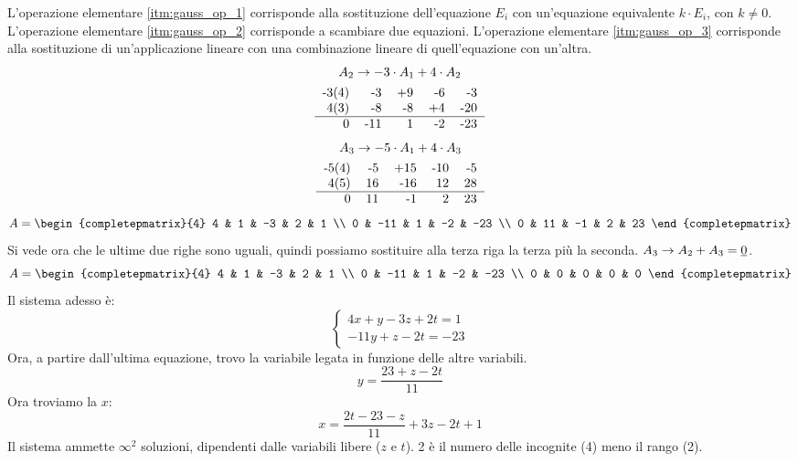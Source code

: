 \begin{exmp}
L'operazione elementare \ref{itm:gauss_op_1} corrisponde alla sostituzione dell'equazione $E_i$ con un'equazione equivalente $k \cdot E_i$, con $k \neq 0$. L'operazione elementare \ref{itm:gauss_op_2} corrisponde a scambiare due equazioni. L'operazione elementare \ref{itm:gauss_op_3} corrisponde alla sostituzione di un'applicazione lineare con una combinazione lineare di quell'equazione con un'altra.
\begin{gather*}
A_2 \to -3 \cdot A_1 + 4 \cdot A_2 \\
\begin{tabular}{*{5}{r}}
-3(4) & -3 & +9 & -6 & -3 \\
4(3) & -8 & -8 & +4 & -20 \\
\hline
0 & -11 & 1 & -2 & -23
\end{tabular}
\end{gather*}
\begin{gather*}
A_3 \to -5 \cdot A_1 + 4 \cdot A_3 \\
\begin{tabular}{*{5}{r}}
-5(4) & -5 & +15 & -10 & -5 \\
4(5) & 16 & -16 & 12 & 28 \\
\hline
0 & 11 & -1 & 2 & 23
\end{tabular}
\end{gather*}
\[
A =
\begin{completepmatrix}{4}
4 & 1 & -3 & 2 & 1 \\
0 & -11 & 1 & -2 & -23 \\
0 & 11 & -1 & 2 & 23
\end{completepmatrix}
\]
Si vede ora che le ultime due righe sono uguali, quindi possiamo sostituire alla terza riga la terza pi\`u la seconda. $A_3 \to A_2 + A_3 = \underline{0}$.
\[
A =
\begin{completepmatrix}{4}
4 & 1 & -3 & 2 & 1 \\
0 & -11 & 1 & -2 & -23 \\
0 & 0 & 0 & 0 & 0
\end{completepmatrix}
\]
Il sistema adesso \`e:
\[
\begin{cases}
4x + y - 3z + 2t = 1 \\
-11y +z - 2t = -23
\end{cases}
\]
Ora, a partire dall'ultima equazione, trovo la variabile legata in funzione delle altre variabili.
\[
y = \frac{23 + z - 2t}{11}
\]
Ora troviamo la $x$:
\[
x = \frac{2t - 23 - z}{11} + 3z - 2t + 1
\]
Il sistema ammette $\infty^2$ soluzioni, dipendenti dalle variabili libere ($z$ e $t$). 2 \`e il numero delle incognite (4) meno il rango (2).
\end{exmp}
